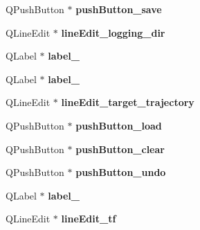 \begin{DoxyCompactItemize}
\item 
Q\+Push\+Button $\ast$ {\bfseries push\+Button\+\_\+save}\hypertarget{class_ui___main_window_a257d4df0fe652a526e4fddba93c7a7d8}{}\label{class_ui___main_window_a257d4df0fe652a526e4fddba93c7a7d8}

\item 
Q\+Line\+Edit $\ast$ {\bfseries line\+Edit\+\_\+logging\+\_\+dir}\hypertarget{class_ui___main_window_a7ab71242b81ef9d13f83c16f6328f35d}{}\label{class_ui___main_window_a7ab71242b81ef9d13f83c16f6328f35d}

\item 
Q\+Label $\ast$ {\bfseries label\+\_}\hypertarget{class_ui___main_window_a2e2516d755e4dd53fc905dabddf2738a}{}\label{class_ui___main_window_a2e2516d755e4dd53fc905dabddf2738a}

\item 
Q\+Label $\ast$ {\bfseries label\+\_}\hypertarget{class_ui___main_window_a0376fd90247280e7c7957cc70628708c}{}\label{class_ui___main_window_a0376fd90247280e7c7957cc70628708c}

\item 
Q\+Line\+Edit $\ast$ {\bfseries line\+Edit\+\_\+target\+\_\+trajectory}\hypertarget{class_ui___main_window_a4a75bfb754049f89fccef822cad712d6}{}\label{class_ui___main_window_a4a75bfb754049f89fccef822cad712d6}

\item 
Q\+Push\+Button $\ast$ {\bfseries push\+Button\+\_\+load}\hypertarget{class_ui___main_window_a67832089879377ce16b3f26fbb2cc3f2}{}\label{class_ui___main_window_a67832089879377ce16b3f26fbb2cc3f2}

\item 
Q\+Push\+Button $\ast$ {\bfseries push\+Button\+\_\+clear}\hypertarget{class_ui___main_window_a5d7af3b0fdbc605e3fd8ae6ceffa0d29}{}\label{class_ui___main_window_a5d7af3b0fdbc605e3fd8ae6ceffa0d29}

\item 
Q\+Push\+Button $\ast$ {\bfseries push\+Button\+\_\+undo}\hypertarget{class_ui___main_window_ab3fd048b1a1dee328d8e1b433955bf29}{}\label{class_ui___main_window_ab3fd048b1a1dee328d8e1b433955bf29}

\item 
Q\+Label $\ast$ {\bfseries label\+\_}\hypertarget{class_ui___main_window_a78c7e10730b43c6700cd7216911ed76a}{}\label{class_ui___main_window_a78c7e10730b43c6700cd7216911ed76a}

\item 
Q\+Line\+Edit $\ast$ {\bfseries line\+Edit\+\_\+tf}\hypertarget{class_ui___main_window_afc0d94ce5096c619c413cfae9b62014c}{}\label{class_ui___main_window_afc0d94ce5096c619c413cfae9b62014c}


\end{DoxyCompactItemize}
